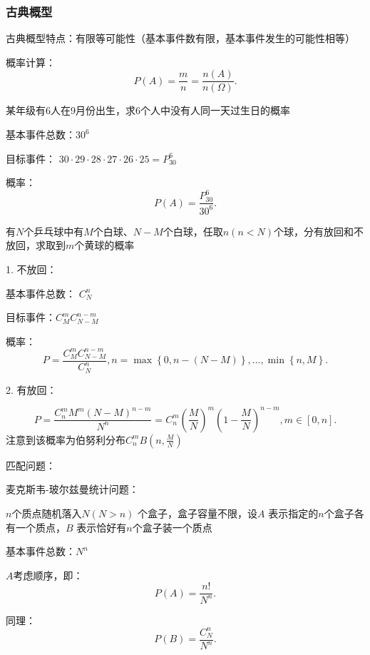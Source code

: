 \subsubsection{古典概型}%
\label{subsub:古典概型}
古典概型特点：有限等可能性（基本事件数有限，基本事件发生的可能性相等）
\begin{notation}
    概率计算：\[
        P\left( A \right) =\frac{m}{n} = \frac{n\left( A \right) }{n\left( \Omega \right) }
    .\] 
\end{notation}
\begin{eg}
    某年级有6人在9月份出生，求6个人中没有人同一天过生日的概率

    基本事件总数：$30^6$

    目标事件： $30\cdot 29\cdot 28\cdot 27\cdot 26\cdot 25=P_{30}^{6}$ 

    概率：\[
        P\left( A \right) =\frac{P_{30}^{6}}{30^6}
    .\] 
\end{eg}
\begin{eg}
    有$N$个乒乓球中有$M$个白球、$N-M$个白球，任取$n(n<N)$个球，分有放回和不放回，求取到$m$个黄球的概率

    1. 不放回：

    基本事件总数： $C_{N}^{n}$ 

    目标事件：$C_{M}^{m}C_{N-M}^{n-m}$ 

    概率： \[
        P=\frac{C_{M}^{m}C_{N-M}^{n-m}}{C_{N}^{n}},n=\max\left\{ 0,n-\left( N-M \right)  \right\}, \ldots,\min\left\{ n,M \right\} 
    .\] 

    2. 有放回：

    \[
    P=\frac{C_{n}^{m}M^m\left( N-M \right) ^{n-m}}{N^n}=C_{n}^{m}\left( \frac{M}{N} \right) ^m\left( 1-\frac{M}{N} \right) ^{n-m},m\in \left[ 0,n \right]
    .\] 
    注意到该概率为伯努利分布$C_{n}^{m}B\left( n,\frac{M}{N} \right) $
\end{eg}
匹配问题：
\begin{eg}
    麦克斯韦-玻尔兹曼统计问题：

    $n$个质点随机落入$N\left( N>n \right) $ 个盒子，盒子容量不限，设$A$ 表示指定的$n$个盒子各有一个质点，$B$ 表示恰好有$n$个盒子装一个质点

    基本事件总数：$N^n$ 

    $A$考虑顺序，即：\[
        P\left( A \right) =\frac{n!}{N^n}
    .\] 

    同理：\[
        P\left( B \right) =\frac{C_{N}^{n}}{N^n}
    .\] 
\end{eg}        
